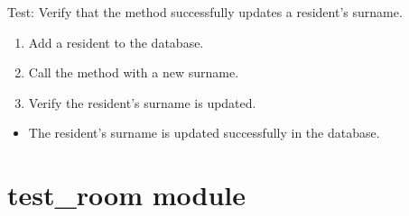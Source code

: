 \documentclass[letterpaper,10pt,english]{sphinxmanual}
\begin{document}
\begin{fulllineitems}
\label{\detokenize{test:test.test_residetnt.test_update_resident_surname_success}}
\pysigstartsignatures
\pysiglinewithargsret
{}
{}
{}
\pysigstopsignatures
\sphinxAtStartPar
Test: Verify that the method successfully updates a resident’s surname.
\begin{description}
\begin{enumerate}
%
\item {} 
\sphinxAtStartPar
Add a resident to the database.

\item {} 
\sphinxAtStartPar
Call the  method with a new surname.

\item {} 
\sphinxAtStartPar
Verify the resident’s surname is updated.

\end{enumerate}

\begin{itemize}
\item {} 
\sphinxAtStartPar
The resident’s surname is updated successfully in the database.

\end{itemize}

\end{description}

\end{fulllineitems}



\section{test\_room module}
\label{\detokenize{test:module-test.test_room}}\label{\detokenize{test:test-room-module}}
\end{document}
